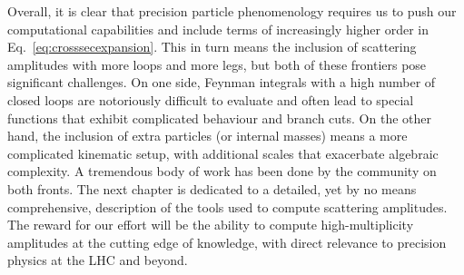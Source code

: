 \documentclass[main.tex]{subfiles}
\begin{document}
Overall, it is clear that precision particle phenomenology requires us to push our computational capabilities and include terms of increasingly higher order in Eq.~\ref{eq:crosssecexpansion}. This in turn means the inclusion of scattering amplitudes with more loops and more legs, but both of these frontiers pose significant challenges. On one side, Feynman integrals with a high number of closed loops are notoriously difficult to evaluate and often lead to special functions that exhibit complicated behaviour and branch cuts. On the other hand, the inclusion of extra particles (or internal masses) means a more complicated kinematic setup, with additional scales that exacerbate algebraic complexity. A tremendous body of work has been done by the community on both fronts. The next chapter is dedicated to a detailed, yet by no means comprehensive, description of the tools used to compute scattering amplitudes. The reward for our effort will be the ability to compute high-multiplicity amplitudes at the cutting edge of knowledge, with direct relevance to precision physics at the LHC and beyond.
\end{document}

